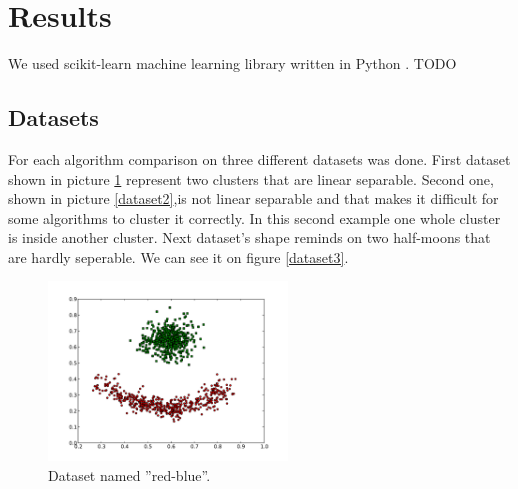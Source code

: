 \documentclass[conference]{IEEEtran}
\begin{document}

\section{Results}
We used scikit-learn machine learning library written in Python \cite{scikit}. TODO

\subsection{Datasets}

For each algorithm comparison on three different datasets was done. First dataset shown in picture \ref{dataset1}
represent two clusters that are linear separable. Second one, shown in picture \ref{dataset2},is not linear separable
and that makes it difficult for some algorithms to cluster it correctly. In this second example one
whole cluster is inside another cluster. Next dataset's shape reminds on two half-moons that are hardly seperable.
We can see it on figure \ref{dataset3}.

\begin{figure}[th]
\centering
\includegraphics[width=15pc]{red-blue-clusters.pdf}
\caption{Dataset named ''red-blue''.}
\label{dataset1}
\end{figure}
\end{document}
